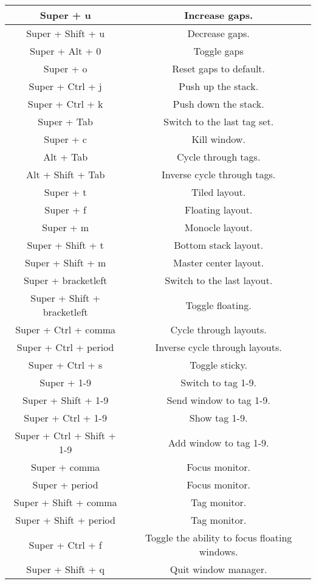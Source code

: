 \begin{longtable}{|c|c|}
    \hline
    Super + u & Increase gaps. \\
    \hline
    Super + Shift + u & Decrease gaps. \\
    \hline
    Super + Alt + 0 & Toggle gaps \\
    \hline
    Super + o & Reset gaps to default. \\
    \hline
    Super + Ctrl + j & Push up the stack. \\
    \hline
    Super + Ctrl + k & Push down the stack. \\
    \hline
    Super + Tab & Switch to the last tag set. \\
    \hline
    Super + c & Kill window. \\
    \hline
    Alt + Tab & Cycle through tags. \\
    \hline
    Alt + Shift + Tab & Inverse cycle through tags. \\
    \hline
    Super + t & Tiled layout. \\
    \hline
    Super + f & Floating layout. \\
    \hline
    Super + m & Monocle layout. \\
    \hline
    Super + Shift + t & Bottom stack layout. \\
    \hline
    Super + Shift + m & Master center layout. \\
    \hline
    Super + bracketleft & Switch to the last layout. \\
    \hline
    Super + Shift + bracketleft & Toggle floating. \\
    \hline
    Super + Ctrl + comma & Cycle through layouts. \\
    \hline
    Super + Ctrl + period & Inverse cycle through layouts. \\
    \hline
    Super + Ctrl + s & Toggle sticky. \\
    \hline
    Super + 1-9 & Switch to tag 1-9. \\
    \hline
    Super + Shift + 1-9 & Send window to tag 1-9. \\
    \hline
    Super + Ctrl + 1-9 & Show tag 1-9. \\
    \hline
    Super + Ctrl + Shift + 1-9 & Add window to tag 1-9. \\
    \hline
    Super + comma & Focus monitor. \\
    \hline
    Super + period & Focus monitor. \\
    \hline
    Super + Shift + comma & Tag monitor. \\
    \hline
    Super + Shift + period & Tag monitor. \\
    \hline
    Super + Ctrl + f & Toggle the ability to focus floating windows. \\
    \hline
    Super + Shift + q & Quit window manager. \\
    \hline

\end{longtable}
